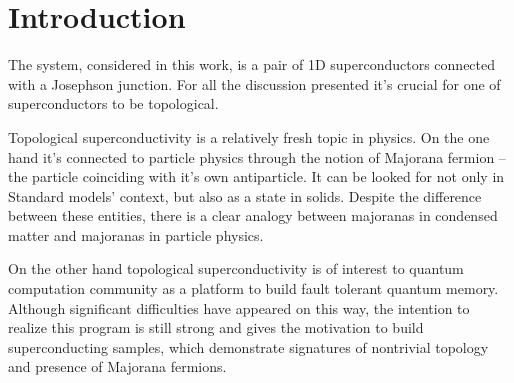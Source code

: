 \chapter{Introduction}


The system, considered in this work, is a pair of 1D superconductors connected with a Josephson junction. For all the discussion presented it's crucial for one of superconductors to be topological. 

Topological superconductivity is a relatively fresh topic in physics. On the one hand it's connected to particle physics through the notion of Majorana fermion -- the particle coinciding with it's own antiparticle\cite{Majorana_1937}. It can be looked for not only in Standard models' context\cite{particle_majorana_Avignone}\cite{particle_majorana_Giuliani}\cite{particle_majorana_Marcocci}, but also as a state in solids\cite{majorana_condmat_Rossi}\cite{majorana_condmat_Kitaev}\cite{majorana_condmat_Kopnin}\cite{majorana_condmat_Motrunich}\cite{majorana_condmat_Nayak}\cite{majorana_condmat_Read_Green}\cite{majorana_condmat_Senthil}\cite{majorana_condmat_Volovik}\cite{majorana_condmat_Fu_Kane}\cite{review_majorana_Aguado}\cite{review_majorana_Beenakker}\cite{review_majorana_Oppen}. Despite the difference between these entities, there is a clear analogy between majoranas in condensed matter and majoranas in particle physics\cite{Dirak_BdG_Chamon}\cite{Dirak_BdG_Elliott}.

 On the other hand topological superconductivity is of interest to quantum computation community as a platform to build fault tolerant quantum memory\cite{majorana_condmat_Kitaev}\cite{quintum_computation_Alicea}\cite{quintum_computation_Nayak}\cite{quintum_computation_Romito}. Although significant difficulties have appeared on this way, the intention to realize this program is still strong and gives the motivation to build superconducting samples, which demonstrate signatures of nontrivial topology and presence of Majorana fermions\cite{majorana_experiment_Kouwenhoven}\cite{majorana_experiment_Vaitiekėnas}\cite{majorana_experiment_Zhang}.
 
